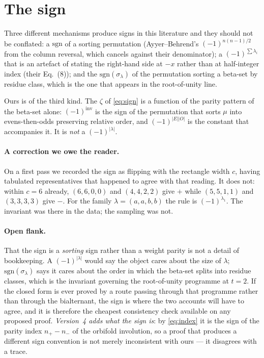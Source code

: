 \documentclass[11pt,a4paper]{article}
\begin{document}
\section{The sign}\label{sec:sign}

Three different mechanisms produce signs in this literature and they should not be conflated: a
$\mathrm{sgn}$ of a sorting permutation (Ayyer--Behrend's $(-1)^{n(n-1)/2}$ from the column
reversal, which cancels against their denominator); a $(-1)^{\sum\lambda_i}$ that is an
artefact of stating the right-hand side at $-x$ rather than at half-integer index (their
Eq.~(8)); and the $\mathrm{sgn}(\sigma_\lambda)$ of the permutation sorting a beta-set by
residue class, which is the one that appears in the root-of-unity line.

Ours is of the third kind. The $\zeta$ of \eqref{eq:sign} is a function of the parity pattern
of the beta-set alone: $(-1)^{\mathrm{inv}}$ is the sign of the permutation that sorts $\mu$
into evens-then-odds preserving relative order, and $(-1)^{|E||O|}$ is the constant that
accompanies it. It is \emph{not} a $(-1)^{|\lambda|}$.

\paragraph{A correction we owe the reader.} On a first pass we recorded the sign as flipping
with the rectangle width $c$, having tabulated representatives that happened to agree with that
reading. It does not: within $c=6$ already, $(6,6,0,0)$ and $(4,4,2,2)$ give $+$ while
$(5,5,1,1)$ and $(3,3,3,3)$ give $-$. For the family $\lambda=(a,a,b,b)$ the rule is
$(-1)^{\lambda_1}$. The invariant was there in the data; the sampling was not.

\paragraph{Open flank.} That the sign is a \emph{sorting} sign rather than a weight parity is
not a detail of bookkeeping. A $(-1)^{|\lambda|}$ would say the object cares about the size of
$\lambda$; $\mathrm{sgn}(\sigma_\lambda)$ says it cares about the order in which the beta-set
splits into residue classes, which is the invariant governing the root-of-unity programme at
$t=2$. If the closed form is ever proved by a route passing through that programme rather than
through the bialternant, the sign is where the two accounts will have to agree, and it is
therefore the cheapest consistency check available on any proposed proof. \emph{Version~4 adds what
the sign \emph{is}}: by \eqref{eq:index} it is the sign of the parity index $n_+-n_-$ of the
orbifold involution, so a proof that produces a different sign convention is not merely
inconsistent with ours --- it disagrees with a trace.
\end{document}
